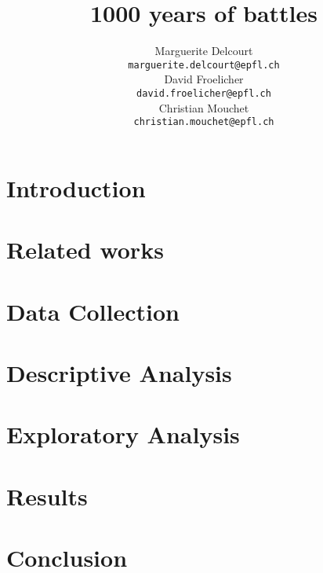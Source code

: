 \documentclass[11pt]{article}
\title{1000 years of battles}
\author{Marguerite Delcourt\\
  {\small \tt marguerite.delcourt@epfl.ch} \\
  \And
  David Froelicher\\
  {\small \tt david.froelicher@epfl.ch}\\
  \And
Christian Mouchet\\
{\small \tt christian.mouchet@epfl.ch} \\}
\date{}
\begin{document}
\maketitle

\begin{abstract}

\end{abstract}


\section{Introduction}


\section{Related works}


\section{Data Collection}


\section{Descriptive Analysis}


\section{Exploratory Analysis}


\section{Results}


\section{Conclusion}

\end{document}

